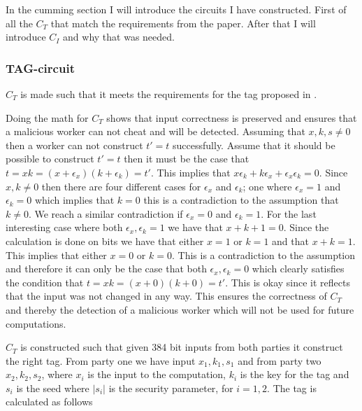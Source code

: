 \documentclass[10pt,a4paper]{article}
\newcommand{\todo}[1]{}
\renewcommand{\todo}[1]{{\color{red} TODO: {#1}} \\}
\begin{document}
\bigskip
In the cumming section I will introduce the circuits I have constructed. First of all the $C_T$ that match the requirements from the paper. After that I will introduce $C_I$ and why that was needed.

\subsubsection{TAG-circuit}
\label{tag-circuit}
$C_T$ is made such that it meets the requirements for the tag proposed in \cite{fosc}.

Doing the math for $C_T$ shows that input correctness is preserved and ensures that a malicious worker can not cheat and will be detected. Assuming that $x,k,s\not=0$ then a worker can not construct $t'=t$ successfully. Assume that it should be possible to construct $t'=t$ then it must be the case that $t=xk=(x+\epsilon_x)(k+\epsilon_k)=t'$. This implies that $x\epsilon_k+k\epsilon_x+\epsilon_x\epsilon_k=0$. Since $x,k\not=0$ then there are four different cases for $\epsilon_x$ and $\epsilon_k$; one where $\epsilon_x=1$ and $\epsilon_k=0$ which implies that $k=0$ this is a contradiction to the assumption that $k\not=0$. We reach a similar contradiction if $\epsilon_x=0$ and $\epsilon_k=1$. For the last interesting case where both $\epsilon_x,\epsilon_k=1$ we have that $x+k+1=0$. Since the calculation is done on bits we have that either $x=1$ or $k=1$ and that $x+k=1$. This implies that either $x=0$ or $k=0$. This is a contradiction to the assumption and therefore it can only be the case that both $\epsilon_x,\epsilon_k=0$ which clearly satisfies the condition that $t=xk=(x+0)(k+0)=t'$. This is okay since it reflects that the input was not changed in any way.
This ensures the correctness of $C_T$ and thereby the detection of a malicious worker which will not be used for future computations.

\bigskip
$C_T$ is constructed such that given 384 bit inputs from both parties it construct the right tag. From party one we have input $x_1, k_1, s_1$ and from party two $x_2, k_2, s_2$, where $x_i$ is the input to the computation, $k_i$ is the key for the tag and $s_i$ is the seed where $|s_i|$ is the security parameter, for $i=1,2$. The tag is calculated as follows 
\end{document}
